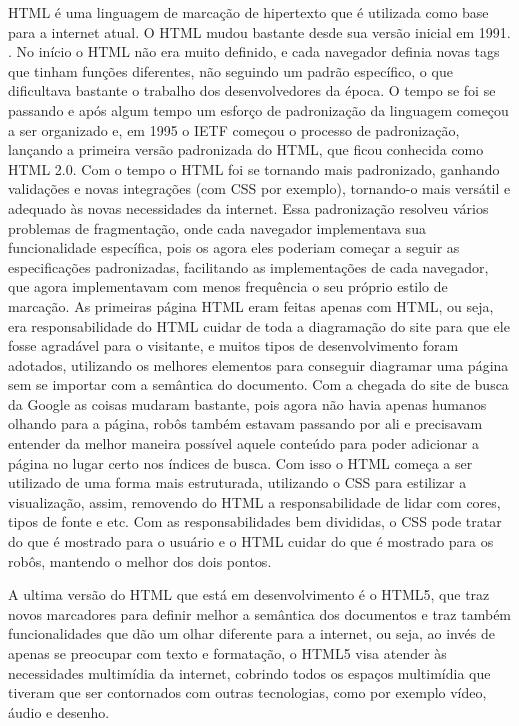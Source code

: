 HTML é uma linguagem de marcação de hipertexto que é utilizada como base para a internet
atual. O HTML mudou bastante desde sua versão inicial em 1991. \cite{powell2003html}.
No início o HTML não era muito definido, e cada
navegador definia novas tags que tinham funções diferentes,
não seguindo um padrão específico, o que dificultava
bastante o trabalho dos desenvolvedores da época.
O tempo se foi se passando e após algum tempo um esforço de padronização da linguagem
começou a ser organizado e, em 1995 o IETF começou o processo de
padronização, lançando a primeira versão padronizada do HTML, que ficou conhecida como HTML 2.0.
Com o tempo o HTML foi se tornando mais padronizado, ganhando validações e novas integrações
(com CSS por exemplo), tornando-o mais versátil e adequado às novas necessidades da
internet.
Essa padronização resolveu vários problemas de fragmentação, onde cada
navegador implementava sua funcionalidade específica, pois os agora
eles poderiam começar a seguir as especificações padronizadas,
facilitando as implementações de cada navegador, que agora implementavam com
menos frequência o seu próprio estilo de marcação.
As primeiras página HTML eram feitas apenas com HTML, ou seja, era
responsabilidade do HTML cuidar de toda a diagramação do site para que
ele fosse agradável para o visitante, e muitos tipos de
desenvolvimento foram adotados, utilizando os melhores elementos para
conseguir diagramar uma página sem se importar com a semântica do
documento. Com a chegada do site de busca da Google as coisas mudaram bastante, pois
agora não havia apenas humanos olhando para a página, robôs também
estavam passando por ali e precisavam entender da melhor maneira
possível aquele conteúdo para poder adicionar a página no lugar certo
nos índices de busca. Com isso o HTML começa a ser utilizado de uma
forma mais estruturada, utilizando o CSS para estilizar a visualização,
assim, removendo do HTML a responsabilidade de lidar com cores, tipos de
fonte e etc. Com as responsabilidades bem divididas, o CSS pode tratar
do que é mostrado para o usuário e o HTML cuidar do que é mostrado
para os robôs, mantendo o melhor dos dois pontos.


A ultima versão do HTML que está em desenvolvimento é o HTML5, que
traz novos marcadores para definir melhor a semântica dos documentos e
traz também funcionalidades que dão um olhar diferente para a internet,
ou seja, ao invés de apenas se preocupar com texto e formatação, o HTML5
visa atender às necessidades multimídia da internet, cobrindo todos os
espaços multimídia que tiveram que ser contornados com outras tecnologias,
como por exemplo vídeo, áudio e desenho.

